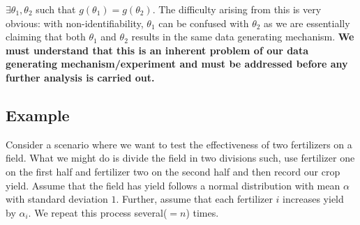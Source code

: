 \documentclass[oneside]{book}
\begin{document}
\begin{center}

    
\end{center}


$\exists \theta_1,\theta_2$ such that $g(\theta_1)=g(\theta_2)$. The difficulty arising from this is very obvious: with non-identifiability, $\theta_1$ can be confused with $\theta_2$ as we are essentially claiming that both $\theta_1$ and $\theta_2$ results in the same data generating mechanism.  \textbf{We must understand that this is an inherent problem of our data generating mechanism/experiment and must be addressed before any further analysis is carried out.} 

\subsection{Example}
Consider a scenario where we want to test the effectiveness of two fertilizers on a field. What we might do is divide the field in two divisions such, use fertilizer one on the first half and fertilizer two on the second half and then record our crop yield. Assume that the field has yield follows a normal distribution with mean $\alpha$ with standard deviation $1$. Further, assume that each fertilizer $i$ increases yield by $\alpha_i$. We repeat this process several($=n$) times.
\end{document}
